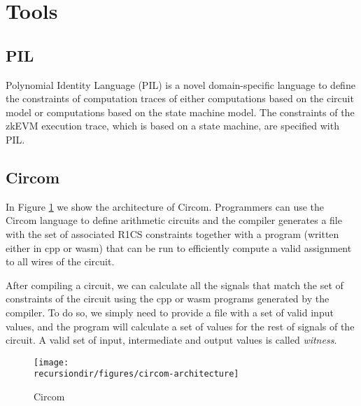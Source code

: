 \fi








\section{Tools}

\subsection{PIL}

Polynomial Identity Language (PIL) is a novel domain-specific language to define the constraints of computation traces of either computations based on the circuit model or computations based on the state machine model. 
The constraints of the zkEVM execution trace, which is based on a state machine, are specified with PIL.


\subsection{Circom}

In Figure \ref{fig:circom_architecture} we show the architecture of Circom.
Programmers can use the Circom language to define arithmetic circuits and the compiler generates a file with the set of associated R1CS constraints together with a program (written either in cpp or wasm) that can be run to efficiently compute a valid assignment to all wires of the circuit.

After compiling a circuit, we can calculate all the signals that match the set of constraints of the circuit using the cpp or wasm programs generated by the compiler. To do so, we simply need to provide a file with a set of valid input values, and the program will calculate a set of values for the rest of signals of the circuit. A valid set of input, intermediate and output values is called \textit{witness}.

\begin{figure}[H]
\centering
\texttt{[image: \\recursiondir/figures/circom-architecture]}
\caption{Circom}
\label{fig:circom_architecture}
\end{figure}



